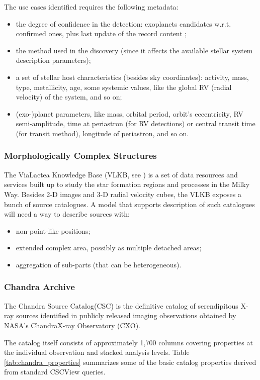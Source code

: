 \documentclass[11pt,a4paper]{ivoa}
\begin{document}
The use cases identified requires the following metadata:
\begin{itemize}[noitemsep,topsep=0pt,parsep=0pt,partopsep=0pt]
	\item the degree of confidence in the detection: exoplanets candidates
w.r.t. confirmed ones, plus last update of the record content ;
	\item the method used in the discovery (since it affects the available
stellar system description parameters);
	\item a set of stellar host characteristics (besides sky coordinates):
activity, mass, type,
metallicity, age, some systemic values, like the global RV (radial
velocity) of the system, and so on;
	\item (exo-)planet parameters, like mass, orbital period, orbit's
eccentricity, RV semi-amplitude, time at periastron (for RV detections)
or central transit time (for transit method), longitude of periastron,
and so on.
\end{itemize}
 
 
\subsubsection{Morphologically Complex Structures}
The ViaLactea Knowledge Base (VLKB, see \cite{2016SPIE.9913E..0HM}) is a set of data
resources and services built up to study the star formation regions and
processes in the Milky Way. Besides 2-D images and 3-D radial velocity
cubes, the VLKB exposes a bunch of source catalogues.
A model that supports description of such catalogues will need a
way to describe sources with:
\begin{itemize}[noitemsep,topsep=0pt,parsep=0pt,partopsep=0pt]
	\item non-point-like positions;
	\item extended complex area, possibly as multiple detached areas;
	\item aggregation of sub-parts (that can be heterogeneous).
\end{itemize}

\subsubsection{Chandra Archive}
The Chandra Source Catalog(CSC) is the definitive catalog of serendipitous X-ray sources identified in
publicly released imaging observations obtained by NASA’s ChandraX-ray Observatory (CXO).

The catalog itself consists of approximately 1,700 columns covering properties at the 
individual observation and stacked analysis levels.
Table \ref{tab:chandra_properties} summarizes some of the basic catalog properties derived
from standard CSCView queries. 
\end{document}

